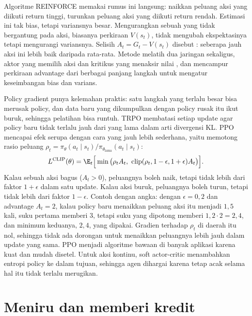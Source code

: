 Algoritme REINFORCE \citep{williams1992} memakai rumus ini langsung: naikkan peluang aksi yang
diikuti return tinggi, turunkan peluang aksi yang diikuti return rendah. Estimasi ini tak bias,
tetapi variansnya besar. Mengurangkan sebuah  yang tidak bergantung pada aksi, biasanya
perkiraan $V(s_t)$, tidak mengubah ekspektasinya tetapi mengurangi variansnya. Selisih
$A_t=G_t-V(s_t)$ disebut : seberapa jauh aksi ini lebih baik daripada rata-rata.
Metode  melatih dua jaringan sekaligus, aktor yang memilih aksi dan kritikus yang
menaksir nilai \citep{mnih2016}, dan  \citep{schulman2016}
mencampur perkiraan advantage dari berbagai panjang langkah untuk mengatur keseimbangan bias dan
varians.

Policy gradient punya kelemahan praktis: satu langkah yang terlalu besar bisa merusak policy, dan
data baru yang dikumpulkan dengan policy rusak itu ikut buruk, sehingga pelatihan bisa runtuh.
TRPO \citep{schulman2015} membatasi setiap update agar policy baru tidak terlalu jauh dari yang lama
dalam arti divergensi KL. PPO \citep{schulman2017} mencapai efek serupa dengan cara yang jauh lebih
sederhana, yaitu memotong rasio peluang $\rho_t=\pi_\theta(a_t\mid s_t)/\pi_{\theta_{\mathrm{lama}}}(a_t\mid s_t)$:
\begin{equation}
L^{\mathrm{CLIP}}(\theta)=\E_t\Big[\min\big(\rho_tA_t,\ \mathrm{clip}(\rho_t,1-\epsilon,1+\epsilon)A_t\big)\Big].
\end{equation}
Kalau sebuah aksi bagus ($A_t>0$), peluangnya boleh naik, tetapi tidak lebih dari faktor $1+\epsilon$
dalam satu update. Kalau aksi buruk, peluangnya boleh turun, tetapi tidak lebih dari faktor
$1-\epsilon$. Contoh dengan angka: dengan $\epsilon=0{,}2$ dan advantage $A_t=2$, kalau policy baru menaikkan peluang aksi itu menjadi
$1{,}5$ kali, suku pertama memberi $3$, tetapi suku yang dipotong memberi $1{,}2\cdot2=2{,}4$, dan minimum keduanya, $2{,}4$, yang
dipakai. Gradien terhadap $\rho_t$ di daerah itu nol, sehingga tidak ada dorongan untuk menaikkan peluangnya lebih jauh dalam
update yang sama. PPO menjadi algoritme bawaan di banyak aplikasi karena kuat dan mudah disetel. Untuk
aksi kontinu, soft actor-critic \citep{haarnoja2018} menambahkan entropi policy ke dalam tujuan,
sehingga agen dihargai karena tetap acak selama hal itu tidak terlalu merugikan.

\section{Meniru dan memberi kredit}


